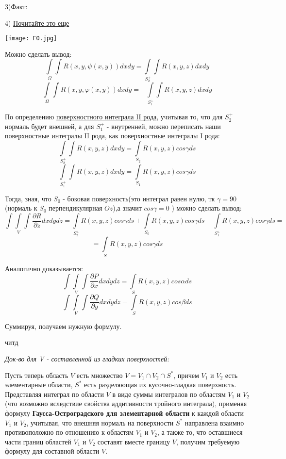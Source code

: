 \documentclass[12pt]{article}
\begin{document}
3)Факт: 

4) \hyperref[eq10]{Почитайте это еще}

\texttt{[image: ГО.jpg]}

Можно сделать вывод:
$$
\int\limits_{\Omega}\int R(x,y,\psi(x,y))dxdy = \int\limits_{S_2^+}\int R(x,y,z)dxdy
$$
$$
\int\limits_{\Omega}\int R(x,y,\varphi(x,y))dxdy = -\int\limits_{S_1^+}\int R(x,y,z)dxdy
$$

По определению \hyperref[eq9]{поверхностного интеграла II рода}, учитывая то, что для $S_2^+$
нормаль будет внешней, а для $S_1^+$ - внутренней, можно переписать наши поверхностные интегралы II рода,
как поверхностные интегралы I рода:
	$$\int\limits_{S_2^+}\int R(x,y,z)dxdy = \int\limits_{S_2} R(x,y,z)cos\gamma ds$$
	$$\int\limits_{S_1^+}\int R(x,y,z)dxdy = \int\limits_{S_1} R(x,y,z)cos\gamma ds$$

Тогда, зная, что $S_0$ - боковая поверхность(это интеграл равен нулю, тк $\gamma = 90$(нормаль к $S_0$ перпендикулярная $Oz$),а значит $cos\gamma = 0$ ) можно сделать вывод:
$$
\int\int\limits_{V}\int \frac{\partial R}{\partial z}dxdydz = \int\limits_{S_2^+} R(x,y,z)cos\gamma ds + 
\int\limits_{S_0} R(x,y,z)cos\gamma ds - \int\limits_{S_1^+} R(x,y,z)cos\gamma ds =
$$
$$
=
\int\limits_{S} R(x,y,z)cos\gamma ds 
$$


Аналогично доказывается:
$$
\int\int\limits_{V}\int \frac{\partial P}{\partial x}dxdydz = \int\limits_{S} R(x,y,z)cos\alpha ds 
$$
$$
\int\int\limits_{V}\int \frac{\partial Q}{\partial y}dxdydz = \int\limits_{S} R(x,y,z)cos\beta ds 
$$

Суммируя, получаем нужную формулу.

читд

\textit{Док-во для V - составленной из гладких поверхностей:}

	Пусть теперь область $V$ есть множество $V = V_1 \cap V_2 \cap S^* $, причем $V_1$
и $V_2$ есть элементарные области, $S^* $ есть разделяющая их кусочно-гладкая
поверхность. Представляя интеграл по области $V$ в виде суммы интегралов по областям $V_1$ и $V_2$ (что возможно вследствие свойства аддитивности
тройного интеграла), применяя формулу \textbf{Гаусса-Остроградского для элементарной области} к каждой области $V_1$ и $V_2$,
учитывая, что внешняя нормаль на поверхности $S^* $ направлена взаимно
противоположно по отношению к областям $V_1$ и $V_2$, а также то, что оставшиеся части границ областей $V_1$ и $V_2$ составят вместе границу $V$, получим
требуемую формулу  для составной области $V$.
\end{document}
